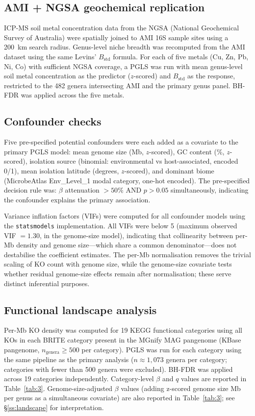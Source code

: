 \documentclass[times]{zHenriquesLab-StyleBioRxiv}
\begin{document}
\subsection{AMI + NGSA geochemical replication}
\label{ss:ami}

ICP-MS soil metal concentration data from the NGSA (National Geochemical Survey
of Australia) were spatially joined to AMI 16S sample sites using a
200~km search radius. Genus-level niche breadth was recomputed from the
AMI dataset using the same Levins' $B_\mathrm{std}$ formula. For each
of five metals (Cu, Zn, Pb, Ni, Co) with sufficient NGSA coverage, a PGLS was
run with mean genus-level soil metal concentration as the predictor ($z$-scored)
and $B_\mathrm{std}$ as the response, restricted to the 482 genera intersecting
AMI and the primary genus panel. BH-FDR was applied across the five
metals.

\subsection{Confounder checks}

Five pre-specified potential confounders were each added as a covariate to the
primary PGLS model: mean genome size (Mb, $z$-scored), GC content (\%,
$z$-scored), isolation source (binomial: environmental vs host-associated,
encoded 0/1), mean isolation latitude (degrees, $z$-scored), and dominant biome
(MicrobeAtlas Env\_Level\_1 modal category, one-hot encoded). The pre-specified
decision rule was: $\beta$ attenuation ${>}50\%$ AND $p > 0.05$ simultaneously,
indicating the confounder explains the primary association.

Variance inflation factors (VIFs) were computed for all confounder models using
the \texttt{statsmodels} implementation. All VIFs were below 5 (maximum observed
VIF $= 1.30$, in the genome-size model), indicating that collinearity between
per-Mb density and genome size---which share a common denominator---does not
destabilise the coefficient estimates. The per-Mb normalisation removes the
trivial scaling of KO count with genome size, while the genome-size covariate
tests whether residual genome-size effects remain after normalisation; these
serve distinct inferential purposes.

\subsection{Functional landscape analysis}

Per-Mb KO density was computed for 19 KEGG functional categories using all KOs
in each BRITE category present in the MGnify MAG pangenome
(KBase pangenome, $n_\mathrm{genera} \geq 500$ per category). PGLS
was run for each category using the same pipeline as the primary analysis ($n \approx 1{,}073$
genera per category; categories with fewer than 500 genera were excluded).
BH-FDR was applied across 19 categories independently.
Category-level $\beta$ and $q$ values are reported in Table~\ref{tab:3}.
Genome-size-adjusted $\beta$ values (adding z-scored genome size Mb per genus as
a simultaneous covariate) are also reported in Table~\ref{tab:3}; see
\S\ref{ss:landscape} for interpretation.
\end{document}
